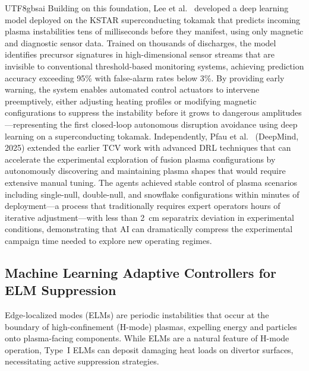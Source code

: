 \documentclass[12pt,a4paper]{article}
\begin{document}
\begin{CJK}{UTF8}{gbsai}
Building on this foundation, Lee et al.~\citep{Lee2025Nature} developed a deep learning model deployed on the KSTAR superconducting tokamak that predicts incoming plasma instabilities tens of milliseconds before they manifest, using only magnetic and diagnostic sensor data. Trained on thousands of discharges, the model identifies precursor signatures in high-dimensional sensor streams that are invisible to conventional threshold-based monitoring systems, achieving prediction accuracy exceeding 95\% with false-alarm rates below 3\%. By providing early warning, the system enables automated control actuators to intervene preemptively, either adjusting heating profiles or modifying magnetic configurations to suppress the instability before it grows to dangerous amplitudes---representing the first closed-loop autonomous disruption avoidance using deep learning on a superconducting tokamak. Independently, Pfau et al.~\citep{Pfau2025Nature} (DeepMind, 2025) extended the earlier TCV work with advanced DRL techniques that can accelerate the experimental exploration of fusion plasma configurations by autonomously discovering and maintaining plasma shapes that would require extensive manual tuning. The agents achieved stable control of plasma scenarios including single-null, double-null, and snowflake configurations within minutes of deployment---a process that traditionally requires expert operators hours of iterative adjustment---with less than 2~cm separatrix deviation in experimental conditions, demonstrating that AI can dramatically compress the experimental campaign time needed to explore new operating regimes.

\subsection{Machine Learning Adaptive Controllers for ELM Suppression}

Edge-localized modes (ELMs) are periodic instabilities that occur at the boundary of high-confinement (H-mode) plasmas, expelling energy and particles onto plasma-facing components. While ELMs are a natural feature of H-mode operation, Type~I ELMs can deposit damaging heat loads on divertor surfaces, necessitating active suppression strategies.


\end{CJK}
\end{document}
